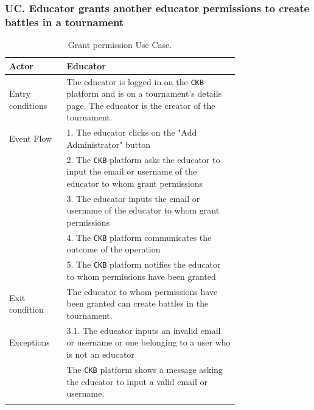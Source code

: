 \subsubsection*{UC\cuc . Educator grants another educator permissions to create battles in a tournament}
\begin{center}
    \begin{longtable}{lp{0.75\linewidth}}
        \hline
        Actor            & Educator \\
        \hline
        Entry conditions & The educator is logged in on the \verb|CKB| platform and is on a tournament's details page. The educator is the creator of the tournament.\\
        \hline
        Event Flow      
        & 1. The educator clicks on the "Add Administrator" button\\
        & 2. The \verb|CKB| platform asks the educator to input the email or username of the educator to whom grant permissions\\
        & 3. The educator inputs the email or username of the educator to whom grant permissions\\
        & 4. The \verb|CKB| platform communicates the outcome of the operation\\
        & 5. The \verb|CKB| platform notifies the educator to whom permissions have been granted\\
        \hline
        Exit condition   & The educator to whom permissions have been granted can create battles in the tournament.   \\
        \hline
        Exceptions   
        & 3.1. The educator inputs an invalid email or username or one belonging to a user who is not an educator\\
            & The \verb|CKB| platform shows a message asking the educator to input a valid email or username.  \\
        \hline
        \caption{Grant permission Use Case.}
        \label{tab: grant_permissions_use_case}
    \end{longtable}


\end{center}
